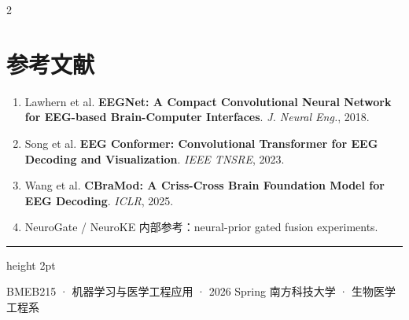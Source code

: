 \documentclass[12pt, a0paper]{article}
\renewcommand{\footnotesize}{\fontsize{15}{20}\selectfont}
\begin{document}
\begin{multicols}{2}
\section*{参考文献}

{\footnotesize
\begin{enumerate}[leftmargin=2em]
    \item Lawhern et al. \textbf{EEGNet: A Compact Convolutional Neural Network for EEG-based Brain-Computer Interfaces}. \textit{J. Neural Eng.}, 2018.
    \item Song et al. \textbf{EEG Conformer: Convolutional Transformer for EEG Decoding and Visualization}. \textit{IEEE TNSRE}, 2023.
    \item Wang et al. \textbf{CBraMod: A Criss-Cross Brain Foundation Model for EEG Decoding}. \textit{ICLR}, 2025.
    \item NeuroGate / NeuroKE 内部参考：neural-prior gated fusion experiments.
\end{enumerate}
}

\end{multicols}

\vspace{4mm}
{\color{myblue}\hrule height 2pt}
\vspace{3mm}
\begin{center}
{\footnotesize\color{mygray}
    BMEB215 · 机器学习与医学工程应用 · 2026 Spring \hspace{3em}
    南方科技大学 · 生物医学工程系
}
\end{center}
\end{document}
